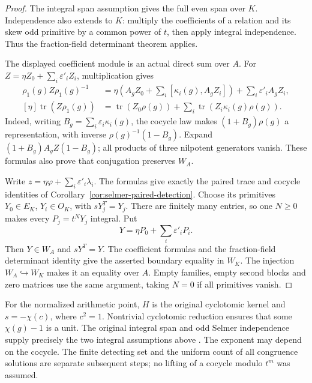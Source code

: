 \begin{proof}
The integral span assumption gives the full even span over $K$.
Independence also extends to $K$: multiply the coefficients of a
relation and its skew odd primitive by a common power of $t$,
then apply integral independence. Thus the fraction-field
determinant theorem applies.

The displayed coefficient module is an actual direct sum over $A$.
For $Z=\eta Z_0+\sum_i\varepsilon'_iZ_i$, multiplication gives
\[
 \begin{aligned}
 \rho_1(g)Z\rho_1(g)^{-1}
   &=\eta\left(A_gZ_0+\sum_i[\kappa_i(g),A_gZ_i]\right)
                       +\sum_i\varepsilon'_iA_gZ_i,\\
 [\eta]\operatorname{tr}(Z\rho_1(g))
   &=\operatorname{tr}(Z_0\rho(g))
                       +\sum_i\operatorname{tr}(Z_i\kappa_i(g)\rho(g)).
 \end{aligned}
\]
Indeed, writing $B_g=\sum_i\varepsilon_i\kappa_i(g)$, the
cocycle law makes $(1+B_g)\rho(g)$ a representation, with inverse
$\rho(g)^{-1}(1-B_g)$. Expand $(1+B_g)A_gZ(1-B_g)$;
all products of three nilpotent generators vanish.
These formulas also prove that conjugation preserves $W_A$.

Write $z=\eta\varphi+\sum_i\varepsilon'_i\lambda_i$.
The formulas give exactly the paired trace and cocycle identities
of Corollary~\ref{cor:selmer-paired-detection}. Choose its primitives
$Y_0\in E_K$, $Y_i\in O_K$, with $sY_j^T=Y_j$.
There are finitely many entries, so one $N\geq0$ makes every
$P_j=t^NY_j$ integral. Put
\[
                         Y=\eta P_0+\sum_i\varepsilon'_iP_i.
\]
Then $Y\in W_A$ and $sY^T=Y$. The coefficient formulas and the
fraction-field determinant identity give the asserted boundary
equality in $W_K$. The injection $W_A\hookrightarrow W_K$
makes it an equality over $A$. Empty families, empty second blocks
and zero matrices use the same argument, taking $N=0$ if all
primitives vanish.
\end{proof}

For the normalized arithmetic point, $H$ is the original cyclotomic
kernel and $s=-\chi(c)$, where $c^2=1$. Nontrivial cyclotomic
reduction ensures that some $\chi(g)-1$ is a unit. The original
integral span and odd Selmer independence supply precisely the two
integral assumptions above \cite{alpo-integral-detection}.
The exponent may depend on the cocycle. The finite detecting set
and the uniform count of all congruence solutions are separate
subsequent steps; no lifting of a cocycle modulo $t^m$ was assumed.
